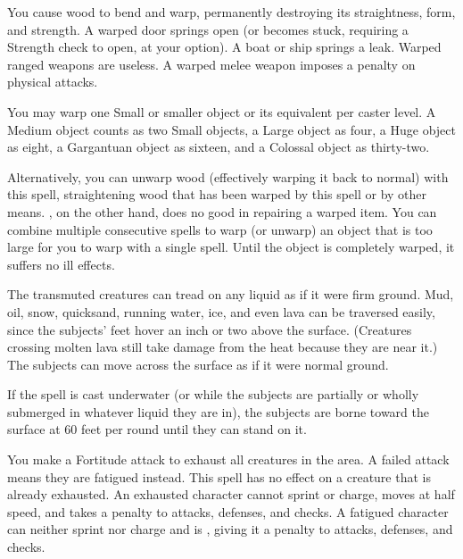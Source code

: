 \spelleffect You cause wood to bend and warp, permanently destroying its straightness, form, and strength. A warped door springs open (or becomes stuck, requiring a Strength check to open, at your option). A boat or ship springs a leak. Warped ranged weapons are useless. A warped melee weapon imposes a  penalty on physical attacks.
\par You may warp one Small or smaller object or its equivalent per caster level. A Medium object counts as two Small objects, a Large object as four, a Huge object as eight, a Gargantuan object as sixteen, and a Colossal object as thirty-two.
\par Alternatively, you can unwarp wood (effectively warping it back to normal) with this spell, straightening wood that has been warped by this spell or by other means. , on the other hand, does no good in repairing a warped item.
\spellnotes You can combine multiple consecutive  spells to warp (or unwarp) an object that is too large for you to warp with a single spell. Until the object is completely warped, it suffers no ill effects.

\spelldur{\durlong \dismissable}
\spelleffect The transmuted creatures can tread on any liquid as if it were firm ground. Mud, oil, snow, quicksand, running water, ice, and even lava can be traversed easily, since the subjects' feet hover an inch or two above the surface. (Creatures crossing molten lava still take damage from the heat because they are near it.) The subjects can move across the surface as if it were normal ground.
\par If the spell is cast underwater (or while the subjects are partially or wholly submerged in whatever liquid they are in), the subjects are borne toward the surface at 60 feet per round until they can stand on it.

\spelldur{\durshort}
\spelleffect You make a Fortitude attack to exhaust all creatures in the area. A failed attack means they are fatigued instead. This spell has no effect on a creature that is already exhausted.
\spellnotes An exhausted character cannot sprint or charge, moves at half speed, and takes a  penalty to attacks, defenses, and checks. A fatigued character can neither sprint nor charge and is \vulnerable, giving it a  penalty to attacks, defenses, and checks.

